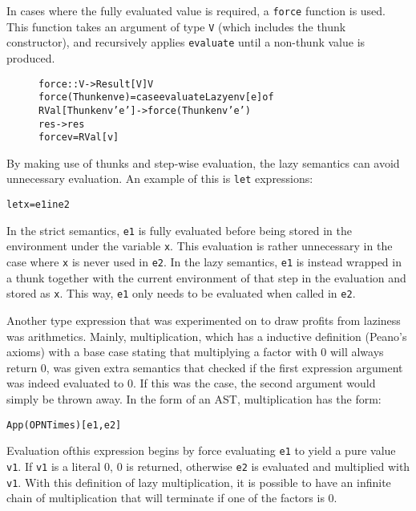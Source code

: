 In cases where the fully evaluated value is required, a \texttt{force} function is used.
This function takes an argument of type \texttt{V} (which includes the thunk constructor),
and recursively applies \texttt{evaluate} until a non-thunk value is produced.

\begin{figure}[!ht]
\begin{alltt}
force :: V -> Result [V] V
force (Thunk env e) = case evaluateLazy env [e] of
  RVal [Thunk env' e'] -> force (Thunk env' e')
  res -> res
force v = RVal [v]
\end{alltt}
\end{figure}

By making use of thunks and step-wise evaluation, the lazy semantics can avoid unnecessary
evaluation. An example of this is \texttt{let} expressions:
\begin{alltt}
  let x = e1 in e2
\end{alltt}
In the strict semantics, \texttt{e1} is fully evaluated before being stored in the
environment under the variable \texttt{x}. 
This evaluation is rather unnecessary in the case where \texttt{x} is never used in
\texttt{e2}. In the lazy semantics, \texttt{e1} is instead wrapped in a thunk together with
the current environment of that step in the evaluation and stored as \texttt{x}. This way,
\texttt{e1} only needs to be evaluated when called in \texttt{e2}.

Another type expression that was experimented on to draw profits from laziness
was arithmetics. Mainly, multiplication, which has a inductive definition
(Peano's axioms) with a base case stating that
multiplying a factor with 0 will always return 0, was given extra semantics that
checked if the first expression argument was indeed evaluated to 0. If this was
the case, the second argument would simply be thrown away. In the form of an
AST, multiplication has the form:
\begin{alltt}
  App (OPN Times) [e1, e2]
\end{alltt}
Evaluation  ofthis expression begins by force evaluating \texttt{e1} to yield a
pure value \texttt{v1}. If \texttt{v1} is a literal 0, 0 is returned, otherwise
\texttt{e2} is evaluated and multiplied with \texttt{v1}. With this definition
of lazy multiplication, it is possible to have an infinite chain of
multiplication that will terminate if one of the factors is 0.


